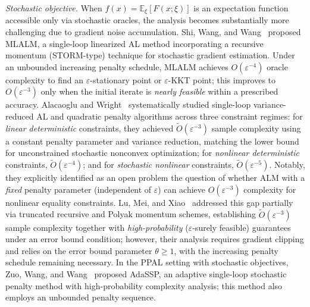\documentclass[10pt]{article}
\begin{document}
\emph{Stochastic objective.}
When $f(x) = \mathbb{E}_\xi[F(x;\xi)]$ is an expectation function accessible only via 
stochastic oracles, the analysis becomes substantially more challenging due to gradient 
noise accumulation.
Shi, Wang, and Wang~\cite{shi2025mlalm} proposed MLALM, a single-loop linearized AL 
method incorporating a recursive momentum (STORM-type) technique 
for stochastic gradient estimation.
Under an unbounded increasing penalty schedule, MLALM achieves $O(\varepsilon^{-4})$ 
oracle complexity to find an $\varepsilon$-stationary point or $\varepsilon$-KKT point; 
this improves to $O(\varepsilon^{-3})$ only when the initial iterate is 
\emph{nearly feasible} within a prescribed accuracy.
Alacaoglu and Wright~\cite{alacaoglu2024} systematically studied single-loop variance-reduced 
AL and quadratic penalty algorithms across three constraint regimes:
for \emph{linear deterministic} constraints, they achieved $\widetilde{O}(\varepsilon^{-3})$ 
sample complexity using a constant penalty parameter and variance reduction, matching the 
lower bound for unconstrained stochastic nonconvex optimization;
for \emph{nonlinear deterministic} constraints, $\widetilde{O}(\varepsilon^{-4})$; 
and for \emph{stochastic nonlinear} constraints, $\widetilde{O}(\varepsilon^{-5})$.
Notably, they explicitly identified as an open problem the question of whether ALM with 
a \emph{fixed} penalty parameter (independent of $\varepsilon$) can achieve 
$O(\varepsilon^{-3})$ complexity for nonlinear equality constraints.
Lu, Mei, and Xiao~\cite{lu2026} addressed this gap partially via truncated recursive 
and Polyak momentum schemes, establishing $\widetilde{O}(\varepsilon^{-3})$ sample 
complexity together with \emph{high-probability} ($\varepsilon$-surely feasible) 
guarantees under an error bound condition; however, their analysis requires 
gradient clipping and relies on the error bound parameter $\theta \geq 1$, with 
the increasing penalty schedule remaining necessary.
In the PPAL setting with stochastic objectives, Zuo, Wang, and Wang~\cite{zuo2025adassp} 
proposed AdaSSP, an adaptive single-loop stochastic penalty method with high-probability 
complexity analysis; this method also employs an unbounded penalty sequence.
\end{document}
